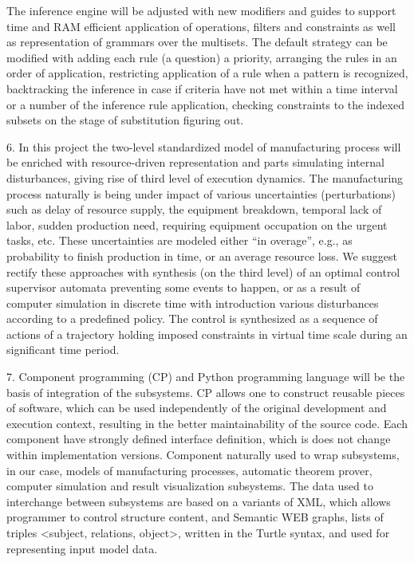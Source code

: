 \documentclass[runningheads]{llncs}
\begin{document}
The inference engine will be adjusted with new modifiers and guides to support time and RAM efficient application of operations, filters and constraints as well as representation of grammars over the multisets. The default strategy can be modified with adding each rule (a question) a priority, arranging the rules in an order of application, restricting application of a rule when a pattern is recognized, backtracking the inference in case if criteria have not met within a time interval or a number of the inference rule application, checking constraints to the indexed subsets on the stage of substitution figuring out.

6. In this project the two-level standardized model of manufacturing process will be enriched with resource-driven representation and parts simulating internal disturbances, giving rise of third level of execution dynamics. The manufacturing process naturally is being under impact of various uncertainties (perturbations) such as delay of resource supply, the equipment breakdown, temporal lack of labor, sudden production need, requiring equipment occupation on the urgent tasks, etc. These uncertainties are modeled either “in overage”, e.g., as probability to finish production in time, or an average resource loss. We suggest rectify these approaches with synthesis (on the third level) of an optimal control supervisor automata preventing some events to happen, or as a result of computer simulation in discrete time with introduction various disturbances according to a predefined policy. The control is synthesized as a sequence of actions of a trajectory holding imposed constraints in virtual time scale during an significant time period.

7. Component programming (CP) and Python programming language will be the basis of integration of the subsystems. CP allows one to construct reusable pieces of software, which can be used independently of the original development and execution context, resulting in the better maintainability of the source code. Each component have strongly defined interface definition, which is does not change within implementation versions. Component naturally used to wrap subsystems, in our case, models of manufacturing processes, automatic theorem prover, computer simulation and result visualization subsystems. The data used to interchange between subsystems are based on a variants of XML, which allows programmer to control structure content, and Semantic WEB graphs, lists of triples <subject, relations, object>, written in the Turtle syntax, and used for representing input model data.
\end{document}
